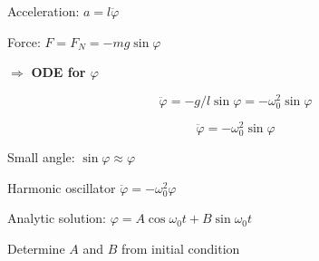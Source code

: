 \begin{frame}[fragile]
\begin{columns}[T]
\begin{column}{0.65\textwidth}
{ \vspace{2ex}

 Acceleration:  $a = l \ddot{\varphi}$

 \vspace{2ex}

 Force: $F=F_N = - m g \sin \varphi$

 \vspace{4ex}

 $\Longrightarrow$ {\bf ODE for $\varphi$}

 $$\ddot{\varphi} = - g / l \sin \varphi = -\omega_0^2 \sin \varphi$$
 }

 {

 $$\ddot{\varphi} = - \omega_0^2 \sin \varphi $$

 Small angle: $\sin \varphi \approx \varphi$

 \vspace{2ex}

 Harmonic oscillator $\ddot{\varphi} = - \omega_0^2 \varphi$

 \vspace{2ex}

 Analytic solution: $\varphi = A \cos \omega_0 t + B \sin \omega_0 t$

 \vspace{2ex}

 Determine $A$ and $B$ from initial condition

 }



\end{column}
\end{columns}
\end{frame}
